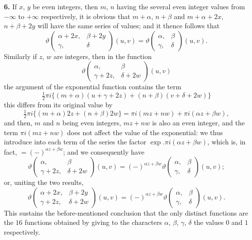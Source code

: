 \documentclass[12pt,a4paper]{article}
\theoremstyle{definition}
\begin{document}
\noindent\textbf{6.}\quad
If $x$, $y$ be even integers, then $m$, $n$ having the several even integer values from $-\infty$ to $+\infty$ respectively, it is obvious that $m + \alpha$, $n + \beta$ and $m + \alpha + 2x$, $n + \beta + 2y$ will have the same series of values; and it thence follows that
\[
\vartheta\begin{pmatrix} \alpha + 2x, & \beta + 2y \\ \gamma, & \delta \end{pmatrix}(u, v) = \vartheta\begin{pmatrix} \alpha, & \beta \\ \gamma, & \delta \end{pmatrix}(u, v).
\]
Similarly if $z$, $w$ are integers, then in the function
\[
\vartheta\begin{pmatrix} \alpha, & \beta \\ \gamma + 2z, & \delta + 2w \end{pmatrix}(u, v)
\]
the argument of the exponential function contains the term
\[
\tfrac{1}{2}\pi i\{(m + \alpha)(u + \gamma + 2z) + (n + \beta)(v + \delta + 2w)\}
\]
this differs from its original value by
\[
\tfrac{1}{2}\pi i\{(m + \alpha)2z + (n + \beta)2w\} = \pi i(mz + nw) + \pi i(\alpha z + \beta w),
\]
and then, $m$ and $n$ being even integers, $mz + nw$ is also an even integer, and the term $\pi i(mz + nw)$ does not affect the value of the exponential: we thus introduce into each term of the series the factor $\exp.\pi i(\alpha z + \beta w)$, which is, in fact, $= (-)^{\alpha z + \beta w}$; and we consequently have
\[
\vartheta\begin{pmatrix} \alpha, & \beta \\ \gamma + 2z, & \delta + 2w \end{pmatrix}(u, v) = (-)^{\alpha z + \beta w}\vartheta\begin{pmatrix} \alpha, & \beta \\ \gamma, & \delta \end{pmatrix}(u, v);
\]
or, uniting the two results,
\[
\vartheta\begin{pmatrix} \alpha + 2x, & \beta + 2y \\ \gamma + 2z, & \delta + 2w \end{pmatrix}(u, v) = (-)^{\alpha z + \beta w}\vartheta\begin{pmatrix} \alpha, & \beta \\ \gamma, & \delta \end{pmatrix}(u, v).
\]
This sustains the before-mentioned conclusion that the only distinct functions are the $16$ functions obtained by giving to the characters $\alpha$, $\beta$, $\gamma$, $\delta$ the values $0$ and $1$ respectively.
\end{document}
